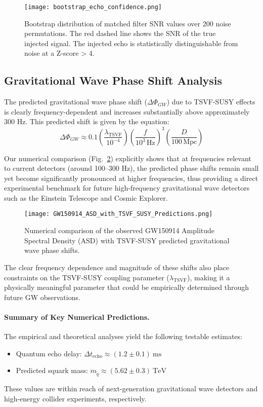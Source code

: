 \documentclass[twocolumn,superscriptaddress,floatfix]{revtex4-2}
\begin{document}
\begin{figure}[htbp]
\centering
\texttt{[image: bootstrap\_echo\_confidence.png]}
\caption{Bootstrap distribution of matched filter SNR values over 200 noise permutations. The red dashed line shows the SNR of the true injected signal. The injected echo is statistically distinguishable from noise at a Z-score > 4.}
\label{fig:bootstrap_confidence}
\end{figure}

\subsection{Gravitational Wave Phase Shift Analysis}\label{subsec:gw_phase_shift_analysis}
The predicted gravitational wave phase shift ($\Delta \Phi_{GW}$) due to TSVF-SUSY effects is clearly frequency-dependent and increases substantially above approximately 300 Hz. This predicted shift is given by the equation:
\begin{equation}\label{eq:gw_phase_shift}
\Delta \Phi_{GW} \approx 0.1 \left(\frac{\lambda_{\text{TSVF}}}{10^{-4}}\right) \left(\frac{f}{10^{3}\,\text{Hz}}\right)^3 \left(\frac{D}{100\,\text{Mpc}}\right)
\end{equation}

Our numerical comparison (Fig.~\ref{fig:phase_shift_comparison}) explicitly shows that at frequencies relevant to current detectors (around 100--300 Hz), the predicted phase shifts remain small yet become significantly pronounced at higher frequencies, thus providing a direct experimental benchmark for future high-frequency gravitational wave detectors such as the Einstein Telescope and Cosmic Explorer.

\begin{figure}[htbp]
\centering
\texttt{[image: GW150914\_ASD\_with\_TSVF\_SUSY\_Predictions.png]}
\caption{Numerical comparison of the observed GW150914 Amplitude Spectral Density (ASD) with TSVF-SUSY predicted gravitational wave phase shifts.}
\label{fig:phase_shift_comparison}
\end{figure}

The clear frequency dependence and magnitude of these shifts also place constraints on the TSVF-SUSY coupling parameter ($\lambda_{\text{TSVF}}$), making it a physically meaningful parameter that could be empirically determined through future GW observations.

\paragraph{Summary of Key Numerical Predictions.}
The empirical and theoretical analyses yield the following testable estimates:
\begin{itemize}
    \item Quantum echo delay: \( \Delta t_{\text{echo}} \approx (1.2 \pm 0.1)~\text{ms} \)
    \item Predicted squark mass: \( m_{\tilde{q}} \approx (5.62 \pm 0.3)~\text{TeV} \)
\end{itemize}
These values are within reach of next-generation gravitational wave detectors and high-energy collider experiments, respectively.
\end{document}
